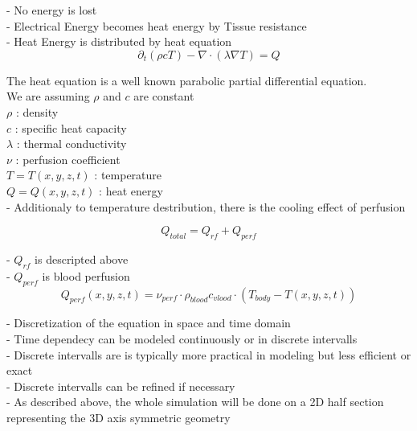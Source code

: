 \documentclass[parskip=half, titlepage=yes, 12pt, BCOR=12mm, DIV=calc]{scrartcl}
\begin{document}
- No energy is lost \\
- Electrical Energy becomes heat energy by Tissue resistance \\
- Heat Energy is distributed by heat equation \\

\begin{equation}
    \partial_t (\rho c T) - \nabla \cdot (\lambda \nabla T) = Q
\end{equation}

The heat equation is a well known parabolic partial differential equation. \\

We are assuming $\rho$ and $c$ are constant \\
$\rho$ : density \\
$c$ : specific heat capacity \\
$\lambda$ : thermal conductivity \\ %
$\nu$ : perfusion coefficient \\
$T = T(x,y,z,t)$ : temperature \\
$Q = Q(x,y,z,t)$ : heat energy \\


- Additionaly to temperature destribution, there is the cooling effect of perfusion 

\begin{equation}
    Q_{total} = Q_{rf} + Q_{perf}
\end{equation}

- $Q_{rf}$ is descripted above \\
- $Q_{perf}$ is blood perfusion \\


\begin{equation}
    Q_{perf}(x,y,z,t) = \nu_{perf} \cdot \rho_{blood} c_{vlood} \cdot (T_{body} - T(x,y,z,t))
\end{equation}


- Discretization of the equation in space and time domain \\
- Time dependecy can be modeled continuously or in discrete intervalls \\
- Discrete intervalls are is typically more practical in modeling but less efficient or exact \\
- Discrete intervalls can be refined if necessary \\

- As described above, the whole simulation will be done on a 2D half section representing the 3D axis symmetric geometry \\ 
\end{document}
